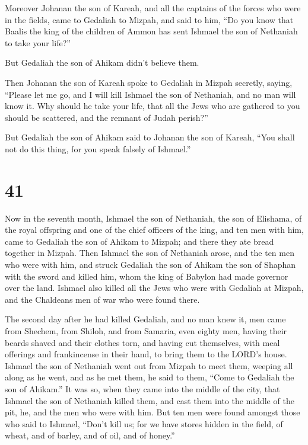  Moreover Johanan the son of Kareah, and all the captains
of the forces who were in the fields, came to Gedaliah to Mizpah,
 and said to him, ``Do you know that Baalis the king of the
children of Ammon has sent Ishmael the son of Nethaniah to take your
life?''

But Gedaliah the son of Ahikam didn't believe them.

 Then Johanan the son of Kareah spoke to Gedaliah in Mizpah
secretly, saying, ``Please let me go, and I will kill Ishmael the son of
Nethaniah, and no man will know it. Why should he take your life, that
all the Jews who are gathered to you should be scattered, and the
remnant of Judah perish?''

 But Gedaliah the son of Ahikam said to Johanan the son of
Kareah, ``You shall not do this thing, for you speak falsely of
Ishmael.''

\hypertarget{section-40}{%
\section{41}\label{section-40}}

 Now in the seventh month, Ishmael the son of Nethaniah, the
son of Elishama, of the royal offspring and one of the chief officers of
the king, and ten men with him, came to Gedaliah the son of Ahikam to
Mizpah; and there they ate bread together in Mizpah.  Then
Ishmael the son of Nethaniah arose, and the ten men who were with him,
and struck Gedaliah the son of Ahikam the son of Shaphan with the sword
and killed him, whom the king of Babylon had made governor over the
land.  Ishmael also killed all the Jews who were with
Gedaliah at Mizpah, and the Chaldeans men of war who were found there.

 The second day after he had killed Gedaliah, and no man
knew it,  men came from Shechem, from Shiloh, and from
Samaria, even eighty men, having their beards shaved and their clothes
torn, and having cut themselves, with meal offerings and frankincense in
their hand, to bring them to the LORD's house.  Ishmael the
son of Nethaniah went out from Mizpah to meet them, weeping all along as
he went, and as he met them, he said to them, ``Come to Gedaliah the son
of Ahikam.''  It was so, when they came into the middle of
the city, that Ishmael the son of Nethaniah killed them, and cast them
into the middle of the pit, he, and the men who were with him.
 But ten men were found amongst those who said to Ishmael,
``Don't kill us; for we have stores hidden in the field, of wheat, and
of barley, and of oil, and of honey.''

